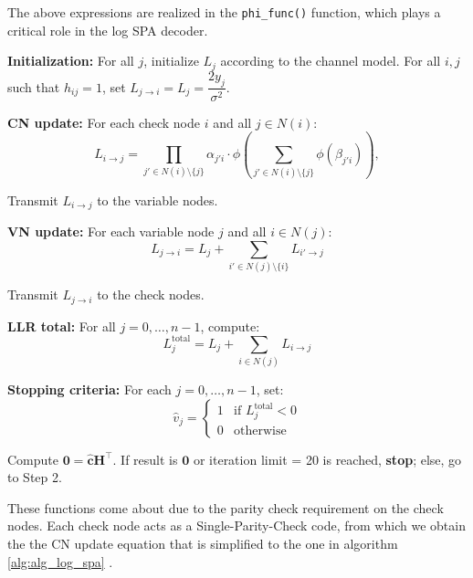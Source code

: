 \documentclass[12pt]{scrreprt}
\begin{document}
	The above expressions are realized in the \verb|phi_func()| function, which plays a critical role in the log SPA decoder.
		\begin{algorithm}
		\caption{The log Sum--Product Algorithm \cite{book_shu_lin} } \label{alg:alg_log_spa}
		\begin{algorithmic}[1] 
			\State \textbf{Initialization:} For all $j$, initialize $L_j$ according to the channel model. For all $i, j$ such that $h_{ij} = 1$, set $L_{j \to i} = L_j = {\dfrac{2 y_j}{\sigma^2}}$.
			
			\State \textbf{CN update:} For each check node $i$ and all $j \in N(i)$:
			\[
			L_{i \to j} = \prod_{j' \in N(i) \setminus \{j\}} \alpha_{j'i} \cdot \phi \left( \sum_{j' \in N(i) \setminus \{j\}} \phi(\beta_{j'i}) \right),
			\]
			
			
			\Statex Transmit $L_{i \to j}$ to the variable nodes.
			
			\State \textbf{VN update:} For each variable node $j$ and all $i \in N(j)$:
			\[
			L_{j \to i} = L_j + \sum_{i' \in N(j) \setminus \{i\}} L_{i' \to j}
			\]
			
			\Statex Transmit $L_{j \to i}$ to the check nodes.
			
			\State \textbf{LLR total:} For all $j = 0, \dots, n{-}1$, compute:
			\[
			L^{\text{total}}_j = L_j + \sum_{i \in N(j)} L_{i \to j}
			\]
			
			\State \textbf{Stopping criteria:} For each $j = 0, \dots, n{-}1$, set:
			\[
			\hat{v}_j = 
			\begin{cases}
				1 & \text{if } L^{\text{total}}_j < 0 \\
				0 & \text{otherwise}
			\end{cases}
			\]
			
			\State Compute $\mathbf{0} = \hat{\mathbf{c}} \mathbf{H}^\top$. If result is $\mathbf{0}$ or iteration limit = 20 is reached, \textbf{stop}; else, go to Step 2.
		\end{algorithmic}
	\end{algorithm}
	
	These functions come about due to the parity check requirement on the check nodes. Each check node acts as a Single-Parity-Check code, from which we obtain the the CN update equation that is simplified to the one in algorithm \ref{alg:alg_log_spa} \cite{book_shu_lin, qc-ldpc}.
	
\end{document}
